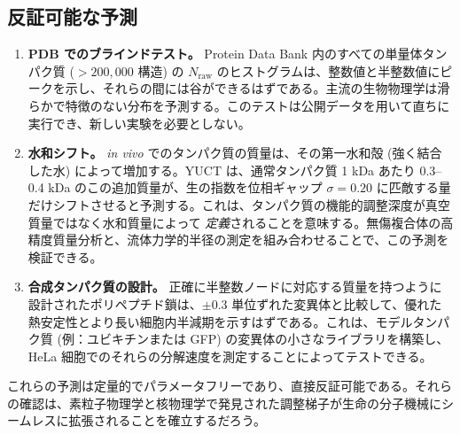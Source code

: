\documentclass[12pt,a4paper]{ltjsarticle}
\begin{document}
	\subsection{反証可能な予測}
	\begin{enumerate}
		\item \textbf{PDB でのブラインドテスト。} Protein Data Bank 内のすべての単量体タンパク質 (\(>200,000\) 構造) の \(N_{\mathrm{raw}}\) のヒストグラムは、整数値と半整数値にピークを示し、それらの間には谷ができるはずである。主流の生物物理学は滑らかで特徴のない分布を予測する。このテストは公開データを用いて直ちに実行でき、新しい実験を必要としない。
		\item \textbf{水和シフト。} \textit{in vivo} でのタンパク質の質量は、その第一水和殻 (強く結合した水) によって増加する。YUCT は、通常タンパク質 1 kDa あたり 0.3–0.4 kDa のこの追加質量が、生の指数を位相ギャップ \(\sigma = 0.20\) に匹敵する量だけシフトさせると予測する。これは、タンパク質の機能的調整深度が真空質量ではなく水和質量によって \emph{定義}されることを意味する。無傷複合体の高精度質量分析と、流体力学的半径の測定を組み合わせることで、この予測を検証できる。
		\item \textbf{合成タンパク質の設計。} 正確に半整数ノードに対応する質量を持つように設計されたポリペプチド鎖は、\(\pm 0.3\) 単位ずれた変異体と比較して、優れた熱安定性とより長い細胞内半減期を示すはずである。これは、モデルタンパク質 (例：ユビキチンまたは GFP) の変異体の小さなライブラリを構築し、HeLa 細胞でのそれらの分解速度を測定することによってテストできる。
	\end{enumerate}
	
	これらの予測は定量的でパラメータフリーであり、直接反証可能である。それらの確認は、素粒子物理学と核物理学で発見された調整梯子が生命の分子機械にシームレスに拡張されることを確立するだろう。
	
\end{document}
